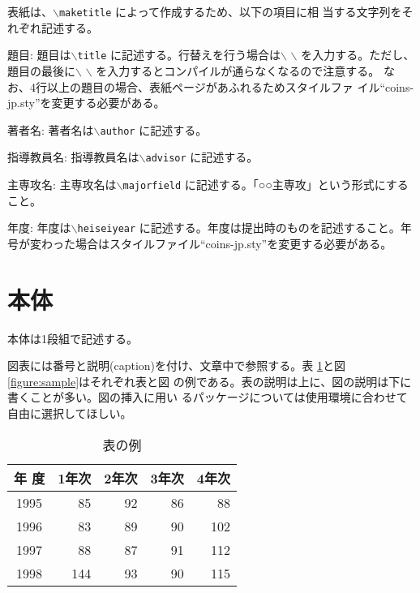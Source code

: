 \documentclass[a4paper,11pt]{jreport}
\begin{document}
表紙は、{\tt $\backslash$maketitle} によって作成するため、以下の項目に相
当する文字列をそれぞれ記述する。

\begin{description} \parskip=1pt
\item{題目: }
題目は{\tt $\backslash$title} に記述する。行替えを行う場合は$\backslash$
	   $\backslash$ を入力する。ただし、題目の最後に$\backslash$
	   $\backslash$ を入力するとコンパイルが通らなくなるので注意する。
	   なお、4行以上の題目の場合、表紙ページがあふれるためスタイルファ
	   イル``coins-jp.sty''を変更する必要がある。
\item{著者名: }
著者名は{\tt $\backslash$author} に記述する。
\item{指導教員名: }
指導教員名は{\tt $\backslash$advisor} に記述する。
\item{主専攻名: }
主専攻名は{\tt $\backslash$majorfield} に記述する。「○○主専攻」という形式にすること。
\item{年度: }
年度は{\tt $\backslash$heiseiyear} に記述する。年度は提出時のものを記述すること。年号が変わった場合はスタイルファイル``coins-jp.sty''を変更する必要がある。
\end{description}

\section{本体}

本体は1段組で記述する。

図表には番号と説明(caption)を付け、文章中で参照する。表
\ref{table:fundamental_data_type}と図\ref{figure:sample}はそれぞれ表と図
の例である。表の説明は上に、図の説明は下に書くことが多い。図の挿入に用い
るパッケージについては使用環境に合わせて自由に選択してほしい。

\begin{table}[hbt]
\caption{表の例}
\label{table:fundamental_data_type}
\begin{center}
\begin{tabular}{| c | r | r | r | r |}
\hline
年 度 & 1年次 & 2年次 & 3年次 & 4年次 \\
\hline
1995 & 85 & 92 & 86 & 88 \\
1996 & 83 & 89 & 90 & 102 \\
1997 & 88 & 87 & 91 & 112 \\
1998 & 144 & 93 & 90 & 115 \\
\hline 
\end{tabular}
\end{center}
\end{table}
\medskip
\end{document}
